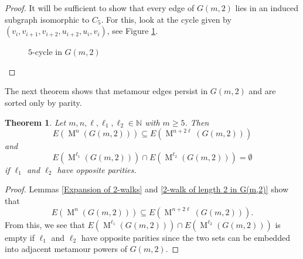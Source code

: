 \documentclass[12pt]{amsart}
\newtheorem{theorem}{Theorem}[section]
\theoremstyle{definition}
\theoremstyle{remark}
\numberwithin{equation}{section}
\numberwithin{figure}{section}
\newcommand{\M}{\operatorname{M}}
\newcommand{\N}{\mathbb{N}}
\begin{document}
\begin{proof}
    It will be sufficient to show that every edge of $G(m,2)$ lies in an induced subgraph isomorphic to $C_5$. For this, look at the cycle given by $(v_i,v_{i+1},v_{i+2},u_{i+2},u_i,v_i)$, see Figure \ref{C_5 in G(m,2)}.    
    \begin{figure}[h!]
        \begin{center}
            \end{center}
        \caption{$5$-cycle in $G(m,2)$}
        \label{C_5 in G(m,2)}
        \end{figure}
\end{proof}

The next theorem shows that metamour edges persist in $G(m,2)$ and are sorted only by parity.
\begin{theorem} \label{thm: G Metamour persistence and parity}
    Let $m,n,\ell,\ell_1,\ell_2\in\N$ with $m\geq 5$. Then 
    \[ E(\M^n(G(m,2))) \subseteq E(\M^{n+2\ell}(G(m,2)))\]
    and
    \[ E(\M^{\ell_1}(G(m,2))) \cap E(\M^{\ell_2}(G(m,2))) = \emptyset\]    
    if $\ell_1$ and $\ell_2$ have opposite parities.
\end{theorem}

\begin{proof}    
    Lemmas \ref{Expansion of 2-walks} and \ref{2-walk of length 2 in G(m,2)} show that 
    \[ E(\M^n(G(m,2))) \subseteq E(\M^{n+2\ell}(G(m,2))).\]
    From this, we see that 
    $E(\M^{\ell_1}(G(m,2))) \cap E(\M^{\ell_2}(G(m,2)))$ is empty if $\ell_1$ and $\ell_2$ have opposite parities since the two sets can be embedded into adjacent metamour powers of $G(m,2)$.
\end{proof}
\end{document}
